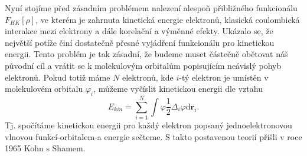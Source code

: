 Nyní stojíme před zásadním problémem nalezení alespoň přibližného funkcionálu $F_{HK}[\rho]$, ve kterém je zahrnuta kinetická energie elektronů, klasická coulombická interakce mezi elektrony a dále korelační a výměnné efekty. 
Ukázalo se, že největší potíže činí dostatečně přesné vyjádření funkcionálu pro kinetickou energii.
Tento problém je tak zásadní, že budeme muset částečně obětovat náš původní cíl a vrátit se k molekulovým orbitalům popisujícím neávislý pohyb elektronů.
Pokud totiž máme $N$ elektronů, kde $i$-tý elektron je umístěn v molekulovém orbitalu $\varphi_i$, můžeme vyčíslit kinetickou energii dle vztahu
\begin{equation}
E_{kin}=\sum_{i=1}^N \int \varphi\frac{1}{2} \Delta_i \varphi \mathrm{d}\textbf{r}_i .
\end{equation}
Tj. spočítáme kinetickou energii pro každý elektron popsaný jednoelektronovou vlnovou funkcí-orbitalem-a energie sečteme. S takto postavenou teorií přišli v roce 1965 Kohn s Shamem.

